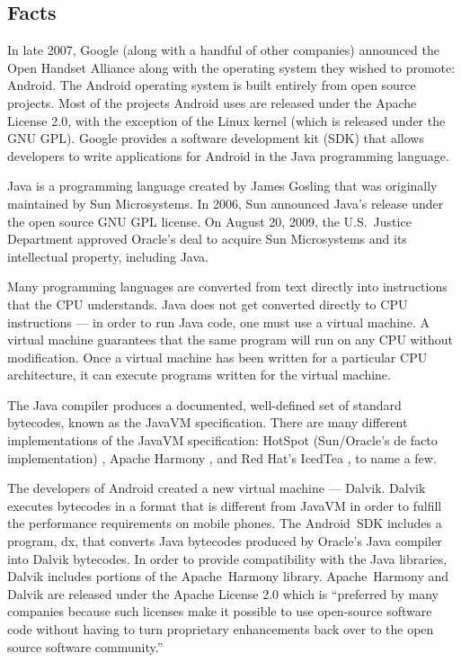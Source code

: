 \documentclass[11pt]{article}
\begin{document}
\begin{multicols}{2}
\setcounter{page}{1}

\section{Facts} %
\label{sec:facts}

In late 2007, Google (along with a handful of other companies) announced the
Open Handset Alliance \cite{open-handset-alliance-ann} along with the operating
system they wished to promote: Android.  The Android operating system is built
entirely from open source projects.  Most of the projects Android uses are
released under the Apache License 2.0, with the exception of the Linux kernel
(which is released under the GNU GPL).  Google provides a software development
kit (SDK) that allows developers to write applications for Android in the Java
programming language.

Java is a programming language created by James Gosling that was originally
maintained by Sun Microsystems.  In 2006, Sun announced Java's release under the
open source GNU GPL license. \cite{sun-open-sources-java} On August 20, 2009,
the U.S.~Justice Department approved Oracle's deal to acquire Sun Microsystems
and its intellectual property, including Java. \cite{oracle-buys-sun}

Many programming languages are converted from text directly into instructions
that the CPU understands.  Java does not get converted directly to CPU
instructions --- in order to run Java code, one must use a virtual machine.  A
virtual machine guarantees that the same program will run on any CPU without
modification.  Once a virtual machine has been written for a particular CPU
architecture, it can execute programs written for the virtual machine.

The Java compiler produces a documented, well-defined set of standard bytecodes,
known as the JavaVM specification. \cite[Chapter 4]{javavm-bytecode}  There are
many different implementations of the JavaVM specification: HotSpot
(Sun/Oracle's de facto implementation) \cite{hotspot}, Apache Harmony
\cite{apache-harmony}, and Red Hat's IcedTea \cite{icedtea}, to name a few.

The developers of Android created a new virtual machine --- Dalvik.  Dalvik
executes bytecodes in a format that is different from JavaVM in order to fulfill
the performance requirements on mobile phones.  \cite{dalvik-bytecode}
\cite{dalvik-vm-arch} The Android~SDK includes a program, dx, that converts
Java bytecodes produced by Oracle's Java compiler into Dalvik bytecodes.
\cite{android-sdk-building} In order to provide compatibility with the Java
libraries, Dalvik includes portions of the Apache~Harmony library.
\cite{apache-harmony} \cite{dalvik-readme}  Apache~Harmony and Dalvik are
released under the Apache License 2.0 \cite{apache-license} which is ``preferred
by many companies because such licenses make it possible to use open-source
software code without having to turn proprietary enhancements back over to the
open source software community.'' \cite{why-apache2-license}


\end{multicols}
\end{document}
